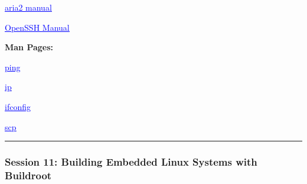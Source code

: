 \documentclass[
  english,
  paper=a4,
  oneside  ,captions=tableheading
]{scrartcl}
\begin{document}
%
  \par\vspace{0.5ex}%
  \href{https://aria2.github.io/manual/en/html/}{\textcolor{blue}{\underline{\faLink\quad aria2 manual}}}%
  \par\vspace{0.5ex}%

%
  \par\vspace{0.5ex}%
  \href{https://www.openssh.com/manual.html}{\textcolor{blue}{\underline{\faLink\quad OpenSSH Manual}}}%
  \par\vspace{0.5ex}%

\textbf{Man Pages:}

%
  \par\vspace{0.5ex}%
  \href{https://linux.die.net/man/8/ping}{\textcolor{blue}{\underline{\faLink\quad ping}}}%
  \par\vspace{0.5ex}%

%
  \par\vspace{0.5ex}%
  \href{https://man7.org/linux/man-pages/man8/ip.8.html}{\textcolor{blue}{\underline{\faLink\quad ip}}}%
  \par\vspace{0.5ex}%

%
  \par\vspace{0.5ex}%
  \href{https://linux.die.net/man/8/ifconfig}{\textcolor{blue}{\underline{\faLink\quad ifconfig}}}%
  \par\vspace{0.5ex}%

%
  \par\vspace{0.5ex}%
  \href{https://man7.org/linux/man-pages/man1/scp.1.html}{\textcolor{blue}{\underline{\faLink\quad scp}}}%
  \par\vspace{0.5ex}%

\begin{center}\rule{0.5\linewidth}{0.5pt}\end{center}

\subsubsection{Session 11: Building Embedded Linux Systems with
Buildroot}\label{session-11-building-embedded-linux-systems-with-buildroot}
\end{document}
